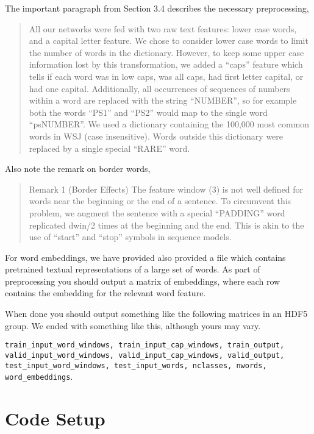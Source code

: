 \documentclass[11pt]{article}
\begin{document}
The important paragraph from Section 3.4 describes the necessary preprocessing, 

\begin{quote}
  All our networks were fed with two
  raw text features: lower case
  words, and a capital letter
  feature. We chose to consider
  lower case words to limit the
  number of words in the
  dictionary. However, to keep some
  upper case information lost by
  this transformation, we added a
  “caps” feature which tells if each
  word was in low caps, was all
  caps, had first letter capital, or
  had one capital. Additionally, all
  occurrences of sequences of
  numbers within a word are replaced
  with the string “NUMBER”, so for
  example both the words “PS1” and
  “PS2” would map to the single word
  “psNUMBER”. We used a dictionary
  containing the 100,000 most common
  words in WSJ (case
  insensitive). Words outside this
  dictionary were replaced by a
  single special “RARE” word.
\end{quote}

Also note the remark on border words, 

\begin{quote}
Remark 1 (Border Effects) The feature window (3) is not well defined for words near
the beginning or the end of a sentence. To circumvent this problem, we augment the sentence
with a special “PADDING” word replicated dwin/2 times at the beginning and the end. This
is akin to the use of “start” and “stop” symbols in sequence models.
\end{quote}

For word embeddings, we have
provided also provided a file
\texttt{} which contains pretrained
textual representations of a large
set of words. As part of
preprocessing you should output a
matrix of embeddings, where each row
contains the embedding for the
relevant word feature.

When done you should output
something like the following
matrices in an HDF5 group. We ended
with something like this, although
yours may vary.

\texttt{train\_input\_word\_windows,
  train\_input\_cap\_windows,
  train\_output,
  valid\_input\_word\_windows,
  valid\_input\_cap\_windows,
  valid\_output,
  test\_input\_word\_windows,
  test\_input\_words, nclasses,
  nwords, word\_embeddings}.


\section{Code Setup}
\end{document}
